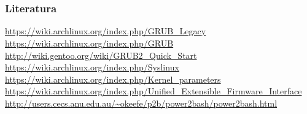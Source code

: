 \documentclass[t]{beamer}
\begin{document}
\section*{}
\begin{frame}
	\frametitle{Literatura}
	\url{https://wiki.archlinux.org/index.php/GRUB_Legacy}\\
	\url{https://wiki.archlinux.org/index.php/GRUB}\\
	\url{http://wiki.gentoo.org/wiki/GRUB2_Quick_Start}\\
	\url{https://wiki.archlinux.org/index.php/Syslinux}
	\vfill
	\url{https://wiki.archlinux.org/index.php/Kernel_parameters}
	\url{https://wiki.archlinux.org/index.php/Unified_Extensible_Firmware_Interface}
	\vfill
	\url{http://users.cecs.anu.edu.au/~okeefe/p2b/power2bash/power2bash.html}\\
\end{frame}
\end{document}

